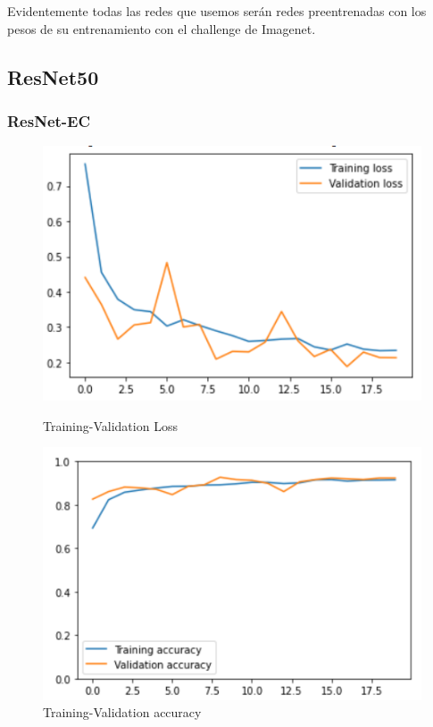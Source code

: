 \documentclass[11pt,a4paper]{article}
\theoremstyle{definition}
\begin{document}
Evidentemente todas las redes que usemos serán redes preentrenadas con los pesos de su entrenamiento con el challenge de Imagenet.


\subsection{ResNet50}

\subsubsection{ResNet-EC}

\begin{figure}[H]
  \centering
  \begin{minipage}[b]{0.45\textwidth}
    \includegraphics[scale=0.75]{./images/resnet1loss}
	\caption{Training-Validation Loss}
  \end{minipage}
  \hfill
  \begin{minipage}[b]{0.45\textwidth}
    \includegraphics[scale=0.75]{./images/resnet1acc}
	\caption{Training-Validation accuracy}
  \end{minipage}
\end{figure}
\end{document}
